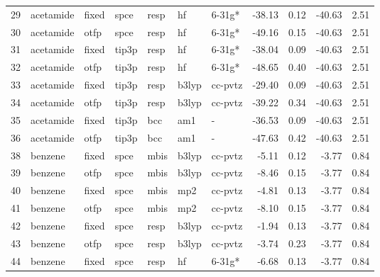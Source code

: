 \begin{tabular}{lllllllrrrr}
29  &                     acetamide &  fixed &   spce &   resp &      hf &       6-31g* &      -38.13 &     0.12 &      -40.63 &      2.51 \\
30  &                     acetamide &   otfp &   spce &   resp &      hf &       6-31g* &      -49.16 &     0.15 &      -40.63 &      2.51 \\
31  &                     acetamide &  fixed &  tip3p &   resp &      hf &       6-31g* &      -38.04 &     0.09 &      -40.63 &      2.51 \\
32  &                     acetamide &   otfp &  tip3p &   resp &      hf &       6-31g* &      -48.65 &     0.40 &      -40.63 &      2.51 \\
33  &                     acetamide &  fixed &  tip3p &   resp &   b3lyp &      cc-pvtz &      -29.40 &     0.09 &      -40.63 &      2.51 \\
34  &                     acetamide &   otfp &  tip3p &   resp &   b3lyp &      cc-pvtz &      -39.22 &     0.34 &      -40.63 &      2.51 \\
35  &                     acetamide &  fixed &  tip3p &    bcc &     am1 &            - &      -36.53 &     0.09 &      -40.63 &      2.51 \\
36  &                     acetamide &   otfp &  tip3p &    bcc &     am1 &            - &      -47.63 &     0.42 &      -40.63 &      2.51 \\
38  &                       benzene &  fixed &   spce &   mbis &   b3lyp &      cc-pvtz &       -5.11 &     0.12 &       -3.77 &      0.84 \\
39  &                       benzene &   otfp &   spce &   mbis &   b3lyp &      cc-pvtz &       -8.46 &     0.15 &       -3.77 &      0.84 \\
40  &                       benzene &  fixed &   spce &   mbis &     mp2 &      cc-pvtz &       -4.81 &     0.13 &       -3.77 &      0.84 \\
41  &                       benzene &   otfp &   spce &   mbis &     mp2 &      cc-pvtz &       -8.10 &     0.15 &       -3.77 &      0.84 \\
42  &                       benzene &  fixed &   spce &   resp &   b3lyp &      cc-pvtz &       -1.94 &     0.13 &       -3.77 &      0.84 \\
43  &                       benzene &   otfp &   spce &   resp &   b3lyp &      cc-pvtz &       -3.74 &     0.23 &       -3.77 &      0.84 \\
44  &                       benzene &  fixed &   spce &   resp &      hf &       6-31g* &       -6.68 &     0.13 &       -3.77 &      0.84 \\

\end{tabular}
